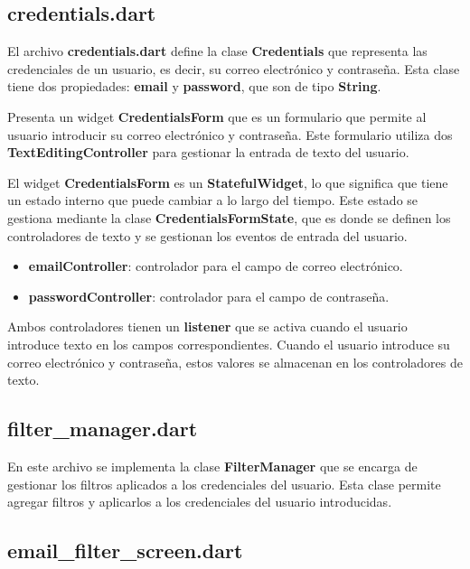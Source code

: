 \documentclass[12pt]{article}
\begin{document}
\subsection{credentials.dart}

El archivo \textbf{credentials.dart} define la clase \textbf{Credentials} que representa las credenciales de un usuario, es decir, su correo electrónico y contraseña. Esta clase tiene dos propiedades: \textbf{email} y \textbf{password}, que son de tipo \textbf{String}.

Presenta un widget \textbf{CredentialsForm} que es un formulario que permite al usuario introducir su correo electrónico y contraseña. Este formulario utiliza dos \textbf{TextEditingController} para gestionar la entrada de texto del usuario.

El widget \textbf{CredentialsForm} es un \textbf{StatefulWidget}, lo que significa que tiene un estado interno que puede cambiar a lo largo del tiempo. Este estado se gestiona mediante la clase \textbf{CredentialsFormState}, que es donde se definen los controladores de texto y se gestionan los eventos de entrada del usuario.

\begin{itemize}
    \item \textbf{emailController}: controlador para el campo de correo electrónico.
    \item \textbf{passwordController}: controlador para el campo de contraseña.
\end{itemize}

Ambos controladores tienen un \textbf{listener} que se activa cuando el usuario introduce texto en los campos correspondientes. Cuando el usuario introduce su correo electrónico y contraseña, estos valores se almacenan en los controladores de texto.

\subsection{filter\_manager.dart}

En este archivo se implementa la clase \textbf{FilterManager} que se encarga de gestionar los filtros aplicados a los credenciales del usuario. Esta clase permite agregar filtros y aplicarlos a los credenciales del usuario introducidas.

\subsection{email\_filter\_screen.dart}
\end{document}
